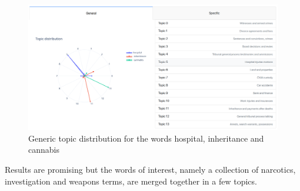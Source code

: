 \begin{figure}
  \begin{center}
    \includegraphics[width=\textwidth]{images/topic1.png}
    \caption{Generic topic distribution for the words hospital, inheritance and cannabis} \label{figt1}
  \end{center}
\end{figure}

\noindent Results are promising but the words of interest, namely a collection 
of narcotics, investigation and weapons terms, are merged together in a few topics.

